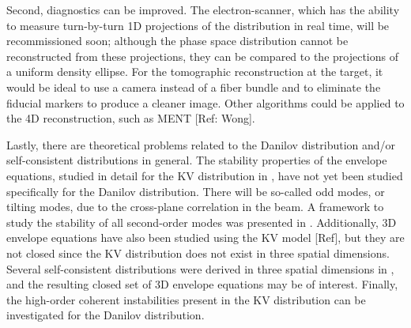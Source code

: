 Second, diagnostics can be improved. The electron-scanner, which has the ability to measure turn-by-turn 1D projections of the distribution in real time, will be recommissioned soon; although the phase space distribution cannot be reconstructed from these projections, they can be compared to the projections of a uniform density ellipse. For the tomographic reconstruction at the target, it would be ideal to use a camera instead of a fiber bundle and to eliminate the fiducial markers to produce a cleaner image. Other algorithms could be applied to the 4D reconstruction, such as MENT [Ref: Wong].

Lastly, there are theoretical problems related to the Danilov distribution and/or self-consistent distributions in general. The stability properties of the envelope equations, studied in detail for the KV distribution in \cite{Lund2004}, have not yet been studied specifically for the Danilov distribution. There will be so-called odd modes, or tilting modes, due to the cross-plane correlation in the beam. A framework to study the stability of all second-order modes was presented in \cite{Yuan2017}. Additionally, 3D envelope equations have also been studied using the KV model [Ref], but they are not closed since the KV distribution does not exist in three spatial dimensions. Several self-consistent distributions were derived in three spatial dimensions in \cite{Danilov2003}, and the resulting closed set of 3D envelope equations may be of interest. Finally, the high-order coherent instabilities present in the KV distribution can be investigated for the Danilov distribution.